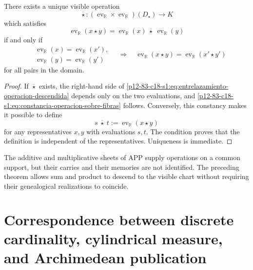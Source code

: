 \begin{theorem}
\label{p12-83-c18-s1:thm:criterio-descenso-operaciones-u024}
There exists a unique visible operation
\begin{equation}
 \overline\star:
 (\operatorname{ev}_{\mathbb R}\times\operatorname{ev}_{\mathbb R})
 (D_\star)\longrightarrow K
 \label{p12-83-c18-s1:eq:operacion-descendida-visible}
\end{equation}
which satisfies
\begin{equation}
 \operatorname{ev}_{\mathbb R}(x\star y)
 =\operatorname{ev}_{\mathbb R}(x)
  \ \overline\star\ 
  \operatorname{ev}_{\mathbb R}(y)
 \label{p12-83-c18-s1:eq:entrelazamiento-operacion-descendida}
\end{equation}
if and only if
\begin{equation}
 \begin{split}
 &\operatorname{ev}_{\mathbb R}(x)=
  \operatorname{ev}_{\mathbb R}(x'),\\
 &\operatorname{ev}_{\mathbb R}(y)=
  \operatorname{ev}_{\mathbb R}(y')
 \end{split}
 \quad\Longrightarrow\quad
 \operatorname{ev}_{\mathbb R}(x\star y)=
 \operatorname{ev}_{\mathbb R}(x'\star y')
 \label{p12-83-c18-s1:eq:constancia-operacion-sobre-fibras}
\end{equation}
for all pairs in the domain.
\end{theorem}

\begin{proof}
If \(\overline\star\) exists, the right-hand side of
\eqref{p12-83-c18-s1:eq:entrelazamiento-operacion-descendida} depends only on the two
evaluations, and
\eqref{p12-83-c18-s1:eq:constancia-operacion-sobre-fibras} follows. Conversely, this
constancy makes it possible to define
\[
 s\ \overline\star\ t
 :=\operatorname{ev}_{\mathbb R}(x\star y)
\]
for any representatives \(x,y\) with evaluations \(s,t\). The
condition proves that the definition is independent of the representatives.
Uniqueness is immediate.
\end{proof}

The additive and multiplicative sheets of APP supply operations on a
common support, but their carries and their memories are not identified. The
preceding theorem allows sum and product to descend to the visible chart
without requiring their genealogical realizations to coincide.

\section{Correspondence between discrete cardinality, cylindrical measure, and Archimedean publication}

